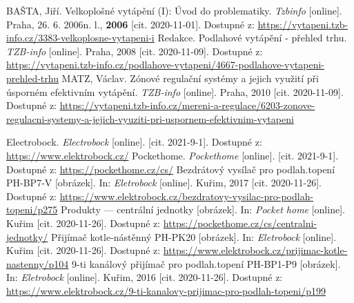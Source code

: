 \begin{thebibliography}{3}

BAŠTA, Jiří. Velkoplošné vytápění (I): Úvod do problematiky. \textit{Tzbinfo} [online]. Praha, 26. 6. 2006n. l., \textbf{2006} [cit. 2020-11-01]. Dostupné z: \url{https://vytapeni.tzb-info.cz/3383-velkoplosne-vytapeni-i}
Redakce. Podlahové vytápění - přehled trhu. \textit{TZB-info} [online]. Praha, 2008 [cit. 2020-11-09]. Dostupné z: \url{https://vytapeni.tzb-info.cz/podlahove-vytapeni/4667-podlahove-vytapeni-prehled-trhu}
MATZ, Václav. Zónové regulační systémy a jejich využití při úsporném efektivním vytápění. \textit{TZB-info} [online]. Praha, 2010 [cit. 2020-11-09]. Dostupné z: \url{https://vytapeni.tzb-info.cz/mereni-a-regulace/6203-zonove-regulacni-systemy-a-jejich-vyuziti-pri-uspornem-efektivnim-vytapeni}

Electrobock. \textit{Electrobock} [online]. [cit. 2021-9-1]. Dostupné z: \url{https://www.elektrobock.cz/}
Pockethome.  \textit{Pockethome} [online]. [cit. 2021-9-1]. Dostupné z: \url{https://pockethome.cz/cs/}
Bezdrátový vysílač pro podlah.topení PH-BP7-V [obrázek]. In: \textit{Eletrobock} [online]. Kuřim, 2017 [cit. 2020-11-26]. Dostupné z: \url{https://www.elektrobock.cz/bezdratovy-vysilac-pro-podlah-topeni/p275}
Produkty --- centrální jednotky [obrázek]. In: \textit{Pocket home} [online]. Kuřim [cit. 2020-11-26]. Dostupné z: \url{https://pockethome.cz/cs/centralni-jednotky/}
Přijímač kotle-nástěnný PH-PK20 [obrázek]. In: \textit{Eletrobock} [online]. Kuřim [cit. 2020-11-26]. Dostupné z: \url{https://www.elektrobock.cz/prijimac-kotle-nastenny/p104}
9-ti kanálový přijímač pro podlah.topení PH-BP1-P9 [obrázek]. In: \textit{Eletrobock} [online]. Kuřim, 2016 [cit. 2020-11-26]. Dostupné z: \url{https://www.elektrobock.cz/9-ti-kanalovy-prijimac-pro-podlah-topeni/p199}


\end{thebibliography}
